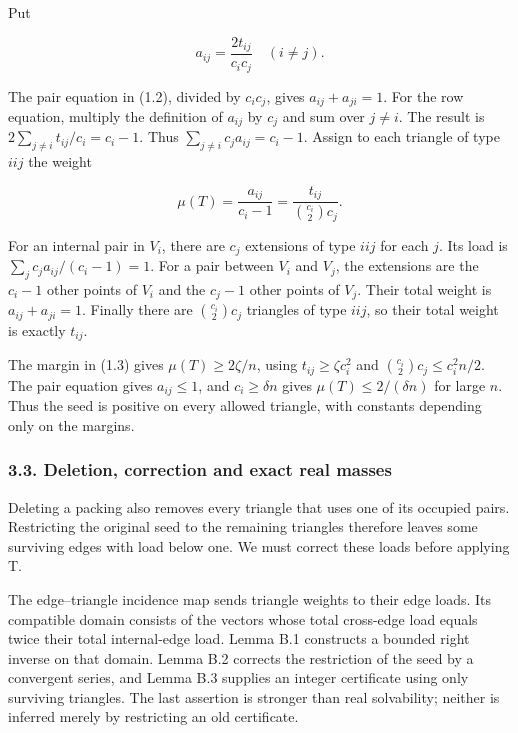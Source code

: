 \documentclass[english,11pt,a4paper]{article}
\begin{document}
Put

\[a_{ij}=\frac{2t_{ij}}{c_ic_j}\quad(i\ne j).\]

The pair equation in (1.2), divided by \(c_ic_j\), gives \(a_{ij}+a_{ji}=1\). For the row equation, multiply the definition of \(a_{ij}\) by \(c_j\) and sum over \(j\ne i\). The result is \(2\sum_{j\ne i}t_{ij}/c_i=c_i-1\). Thus \(\sum_{j\ne i}c_j a_{ij}=c_i-1\). Assign to each triangle of type \(iij\) the weight

\[\mu(T)=\frac{a_{ij}}{c_i-1}
=\frac{t_{ij}}{\binom{c_i}{2}c_j}.\tag{3.1}\]

For an internal pair in \(V_i\), there are \(c_j\) extensions of type \(iij\) for each \(j\). Its load is \(\sum_jc_ja_{ij}/(c_i-1)=1\). For a pair between \(V_i\) and \(V_j\), the extensions are the \(c_i-1\) other points of \(V_i\) and the \(c_j-1\) other points of \(V_j\). Their total weight is \(a_{ij}+a_{ji}=1\). Finally there are \(\binom{c_i}{2}c_j\) triangles of type \(iij\), so their total weight is exactly \(t_{ij}\).

The margin in (1.3) gives \(\mu(T)\ge2\zeta/n\), using \(t_{ij}\ge\zeta c_i^2\) and \(\binom{c_i}{2}c_j\le c_i^2n/2\). The pair equation gives \(a_{ij}\le1\), and \(c_i\ge\delta n\) gives \(\mu(T)\le2/(\delta n)\) for large \(n\). Thus the seed is positive on every allowed triangle, with constants depending only on the margins.

\subsubsection{3.3. Deletion, correction and exact real masses}\label{deletion-correction-and-exact-real-masses}

Deleting a packing also removes every triangle that uses one of its occupied pairs. Restricting the original seed to the remaining triangles therefore leaves some surviving edges with load below one. We must correct these loads before applying T.

The edge--triangle incidence map sends triangle weights to their edge loads. Its compatible domain consists of the vectors whose total cross-edge load equals twice their total internal-edge load. Lemma B.1 constructs a bounded right inverse on that domain. Lemma B.2 corrects the restriction of the seed by a convergent series, and Lemma B.3 supplies an integer certificate using only surviving triangles. The last assertion is stronger than real solvability; neither is inferred merely by restricting an old certificate.
\end{document}
